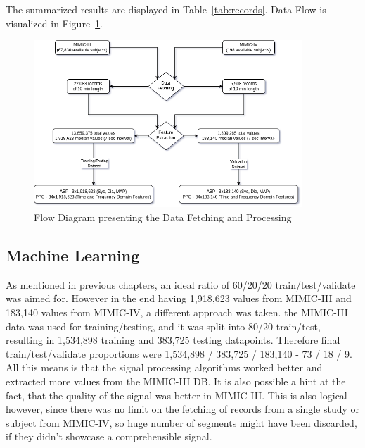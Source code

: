 The summarized results are displayed in Table~\ref{tab:records}.
Data Flow is visualized in Figure~\ref{fig:data_flow}.

\begin{figure}[h]
    \centering
    \includegraphics[width=0.9\textwidth]{images/results/flow_diagram}
    \caption{Flow Diagram presenting the Data Fetching and Processing}
    \label{fig:data_flow}
\end{figure}

\subsection{Machine Learning}
\label{subsec:machine_learning}

As mentioned in previous chapters, an ideal ratio of 60/20/20 train/test/validate was aimed for.
However in the end having 1,918,623 values from MIMIC-III and 183,140 values from MIMIC-IV, a different approach was taken.
the MIMIC-III data was used for training/testing, and it was split into 80/20 train/test, resulting in 1,534,898 training and 383,725 testing datapoints.
Therefore final train/test/validate proportions were 1,534,898 / 383,725 / 183,140 - 73 / 18 / 9.
All this means is that the signal processing algorithms worked better and extracted more values from the MIMIC-III DB.
It is also possible a hint at the fact, that the quality of the signal was better in MIMIC-III.
This is also logical however, since there was no limit on the fetching of records from a single study or subject from MIMIC-IV,
so huge number of segments might have been discarded, if they didn't showcase a comprehensible signal.

